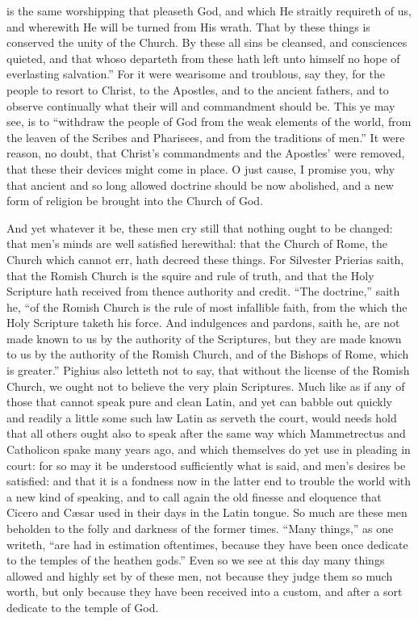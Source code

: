 is the same worshipping that pleaseth God, and which He straitly requireth
of us, and wherewith He will be turned from His wrath. That by
these things is conserved the unity of the Church. By these all
sins be cleansed, and consciences quieted, and that whoso departeth
from these hath left unto himself no hope of everlasting salvation.”
For it were wearisome and troublous, say they, for the people to resort
to Christ, to the Apostles, and to the ancient fathers, and to observe
continually what their will and commandment should be. This ye
may see, is to “withdraw the people of God from the weak elements
of the world, from the leaven
of the Scribes and Pharisees, and from the traditions of men.”
It were reason, no doubt, that Christ’s commandments and the Apostles’
were removed, that these their devices might come in place. O
just cause, I promise you, why that ancient and so long allowed doctrine
should be now abolished, and a new form of religion be brought into
the Church of God.

And yet whatever it be, these men cry still that nothing ought to
be changed: that men’s minds are well satisfied herewithal: that
the Church of Rome, the Church which cannot err, hath decreed these
things. For Silvester Prierias saith, that the Romish Church is
the squire and rule of truth, and that the Holy Scripture hath received
from thence authority and credit. “The doctrine,”
saith he, “of the Romish Church is the rule of most infallible
faith, from the which the Holy Scripture taketh his force. And
indulgences and pardons, saith he, are not made known to us by the authority
of the Scriptures, but they are made known to us by the authority of
the Romish Church, and of the Bishops of Rome, which is greater.”
Pighius also letteth not to say, that without the license of the Romish
Church, we ought not to believe the very plain Scriptures. Much
like as if any of those that
cannot speak pure and clean Latin, and yet can babble out quickly and
readily a little some such law Latin as serveth the court, would needs
hold that all others ought also to speak after the same way which Mammetrectus
and Catholicon spake many years ago, and which themselves do yet use
in pleading in court: for so may it be understood sufficiently what
is said, and men’s desires be satisfied: and that it is a fondness
now in the latter end to trouble the world with a new kind of speaking,
and to call again the old finesse and eloquence that Cicero and Cæsar
used in their days in the Latin tongue. So much are these men
beholden to the folly and darkness of the former times. “Many
things,” as one writeth, “are had in estimation oftentimes,
because they have been once dedicate to the temples of the heathen gods.”
Even so we see at this day many things allowed and highly set by of
these men, not because they judge them so much worth, but only because
they have been received into a custom, and after a sort dedicate to
the temple of God.

